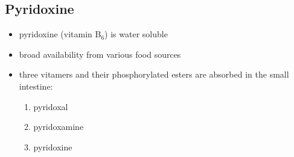 \documentclass{scrartcl}
\begin{document}
\subsection{Pyridoxine}
\label{sec:org17444e9}
\begin{itemize}
\item pyridoxine (vitamin B\(_{\text{6}}\)) is water soluble
\item broad availability from various food sources
\item three vitamers and their phosphorylated esters are absorbed in the
small intestine:
\begin{enumerate}
\item pyridoxal
\item pyridoxamine
\item pyridoxine
\end{enumerate}


\end{itemize}
\end{document}
